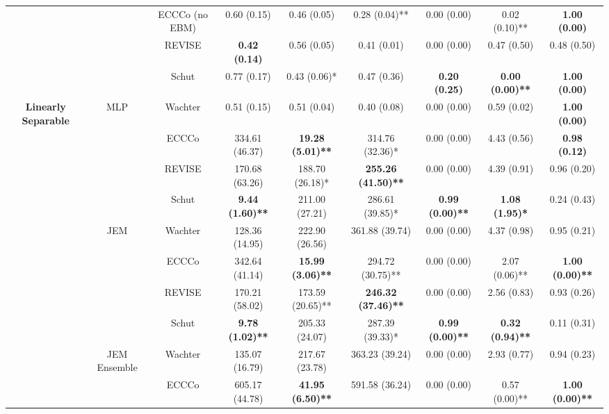 \begin{table}
{\begin{tabular}[t]{>{}c|c|c|c|c|c|c|c|c}
 &  & ECCCo (no EBM) & 0.60 (0.15) & 0.46 (0.05) & 0.28 (0.04)** & 0.00 (0.00) & 0.02 (0.10)** & \textbf{1.00 (0.00)}\\

 &  & REVISE & \textbf{0.42 (0.14)} & 0.56 (0.05) & 0.41 (0.01) & 0.00 (0.00) & 0.47 (0.50) & 0.48 (0.50)\\

 &  & Schut & 0.77 (0.17) & 0.43 (0.06)* & 0.47 (0.36) & \textbf{0.20 (0.25)} & \textbf{0.00 (0.00)**} & \textbf{1.00 (0.00)}\\

\multirow{-12}{*}{\centering\arraybackslash \textbf{Linearly Separable}} & \multirow{-6}{*}{\centering\arraybackslash MLP} & Wachter & 0.51 (0.15) & 0.51 (0.04) & 0.40 (0.08) & 0.00 (0.00) & 0.59 (0.02) & \textbf{1.00 (0.00)}\\
\cline{1-9}
 &  & ECCCo & 334.61 (46.37) & \textbf{19.28 (5.01)**} & 314.76 (32.36)* & 0.00 (0.00) & 4.43 (0.56) & \textbf{0.98 (0.12)}\\

 &  & REVISE & 170.68 (63.26) & 188.70 (26.18)* & \textbf{255.26 (41.50)**} & 0.00 (0.00) & 4.39 (0.91) & 0.96 (0.20)\\

 &  & Schut & \textbf{9.44 (1.60)**} & 211.00 (27.21) & 286.61 (39.85)* & \textbf{0.99 (0.00)**} & \textbf{1.08 (1.95)*} & 0.24 (0.43)\\

 & \multirow{-4}{*}{\centering\arraybackslash JEM} & Wachter & 128.36 (14.95) & 222.90 (26.56) & 361.88 (39.74) & 0.00 (0.00) & 4.37 (0.98) & 0.95 (0.21)\\
\cline{2-9}
 &  & ECCCo & 342.64 (41.14) & \textbf{15.99 (3.06)**} & 294.72 (30.75)** & 0.00 (0.00) & 2.07 (0.06)** & \textbf{1.00 (0.00)**}\\

 &  & REVISE & 170.21 (58.02) & 173.59 (20.65)** & \textbf{246.32 (37.46)**} & 0.00 (0.00) & 2.56 (0.83) & 0.93 (0.26)\\

 &  & Schut & \textbf{9.78 (1.02)**} & 205.33 (24.07) & 287.39 (39.33)* & \textbf{0.99 (0.00)**} & \textbf{0.32 (0.94)**} & 0.11 (0.31)\\

 & \multirow{-4}{*}{\centering\arraybackslash JEM Ensemble} & Wachter & 135.07 (16.79) & 217.67 (23.78) & 363.23 (39.24) & 0.00 (0.00) & 2.93 (0.77) & 0.94 (0.23)\\
\cline{2-9}
 &  & ECCCo & 605.17 (44.78) & \textbf{41.95 (6.50)**} & 591.58 (36.24) & 0.00 (0.00) & 0.57 (0.00)** & \textbf{1.00 (0.00)**}\\


\end{tabular}}
\end{table}
